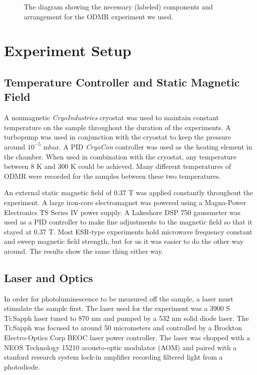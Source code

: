\documentclass[oneside, astronomy, noacknowlegments]{BYUPhys}
\begin{document}
\begin{figure}
    \caption[Diagram of Experimental Setup for ODMR]{\label{fig:setup}
     The diagram showing the necessary (labeled) components and arrangement for the ODMR experiment we used.}
 \end{figure}

\section{Experiment Setup}
\label{sec:Experiment}

\subsection{Temperature Controller and Static Magnetic Field}

A nonmagnetic \textit{CryoIndustries} cryostat was used to maintain constant temperature on the sample throughout the duration of the experiments. A turbopump was used in conjunction with the cryostat to keep the pressure around $10^{-5}$ mbar. A PID \textit{CryoCon} controller was used as the heating element in the chamber. When used in combination with the cryostat, any temperature between 8 K and 300 K could be achieved. Many different temperatures of ODMR were recorded for the samples between these two temperatures.

An external static magnetic field of 0.37 T was applied constantly throughout the experiment. A large iron-core electromagnet was powered using a Magna-Power Electronics TS Series IV power supply. A Lakeshore DSP 750 gaussmeter was used as a PID controller to make fine adjustments to the magnetic field so that it stayed at 0.37 T. Most ESR-type experiments hold microwave frequency constant and sweep magnetic field strength, but for us it was easier to do the other way around. The results show the same thing either way.

\subsection{Laser and Optics}

In order for photoluminescence to be measured off the sample, a laser must stimulate the sample first. The laser used for the experiment was a 3900 S Ti:Sapph laser tuned to 870 nm and pumped by a 532 nm solid diode laser. The Ti:Sapph was focused to around 50 micrometers and controlled by a Brockton Electro-Optics Corp BEOC laser power controller. The laser was chopped with a NEOS Technology 15210 acousto-optic modulator (AOM) and paired with a stanford research system lock-in amplifier recording filtered light from a photodiode.
\end{document}
